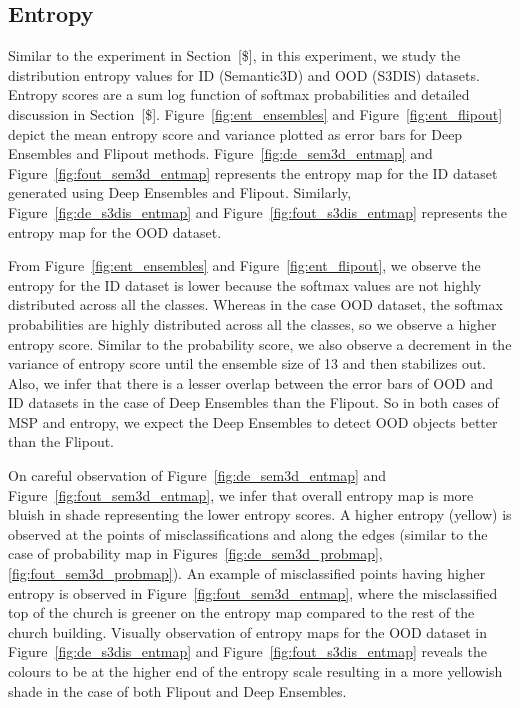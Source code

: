     \subsection{Entropy}
    \label{sec:ent_sem3dvs3dis}

    Similar to the experiment in Section~[\$], in this experiment, we study the distribution entropy values for ID (Semantic3D) and OOD (S3DIS) datasets.
    Entropy scores are a sum log function of softmax probabilities and detailed discussion in Section~[\$].
    Figure~\ref{fig:ent_ensembles} and Figure~\ref{fig:ent_flipout} depict the mean entropy score and variance plotted as error bars for Deep Ensembles and Flipout methods.    
    Figure~\ref{fig:de_sem3d_entmap} and Figure~\ref{fig:fout_sem3d_entmap} represents the entropy map for the ID dataset generated using Deep Ensembles and Flipout.
    Similarly, Figure~\ref{fig:de_s3dis_entmap} and Figure~\ref{fig:fout_s3dis_entmap} represents the entropy map for the OOD dataset.

    From Figure~\ref{fig:ent_ensembles} and Figure~\ref{fig:ent_flipout}, we observe the entropy for the ID dataset is lower because the softmax values are not highly distributed across all the classes.
    Whereas in the case OOD dataset, the softmax probabilities are highly distributed across all the classes, so we observe a higher entropy score.
    Similar to the probability score, we also observe a decrement in the variance of entropy score until the ensemble size of 13 and then stabilizes out.
    Also, we infer that there is a lesser overlap between the error bars of OOD and ID datasets in the case of Deep Ensembles than the Flipout.
    So in both cases of MSP and entropy, we expect the Deep Ensembles to detect OOD objects better than the Flipout.

    On careful observation of Figure~\ref{fig:de_sem3d_entmap} and Figure~\ref{fig:fout_sem3d_entmap}, we infer that overall entropy map is more bluish in shade representing the lower entropy scores.
    A higher entropy (yellow) is observed at the points of misclassifications and along the edges (similar to the case of probability map in Figures~\ref{fig:de_sem3d_probmap}, \ref{fig:fout_sem3d_probmap}).
    An example of misclassified points having higher entropy is observed in Figure~\ref{fig:fout_sem3d_entmap}, where the misclassified top of the church is greener on the entropy map compared to the rest of the church building.
    Visually observation of entropy maps for the OOD dataset in Figure~\ref{fig:de_s3dis_entmap} and Figure~\ref{fig:fout_s3dis_entmap} reveals the colours to be at the higher end of the entropy scale resulting in a more yellowish shade in the case of both Flipout and Deep Ensembles.

